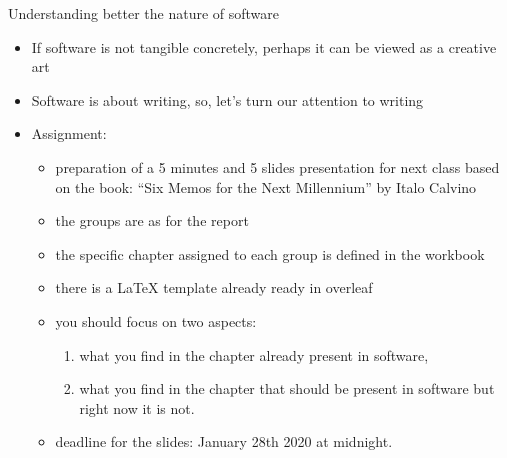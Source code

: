 \documentclass{beamer}
\begin{document}
\begin{frame}{\centerline{Understanding better the nature of software}}
\begin{itemize}
\item If software is not tangible concretely, perhaps it can be viewed as a creative art
\item Software is about writing, so, let's turn our attention to writing
\item Assignment: 
\begin{itemize}
\item preparation of a 5 minutes and 5 slides presentation for next class based on the book: ``Six Memos for the Next Millennium'' by Italo Calvino
\item the groups are as for the report
\item the specific chapter assigned to each group is defined in the workbook
\item there is a LaTeX template already ready in overleaf
\item you should focus on two aspects:
\begin{enumerate}
\item what you find in the chapter already present in software,
\item what you find in the chapter that should be present in software but right now it is not.
\end{enumerate}
\item deadline for the slides: January 28th 2020 at midnight.
\end{itemize}
\end{itemize}

\end{frame}



\end{document}

